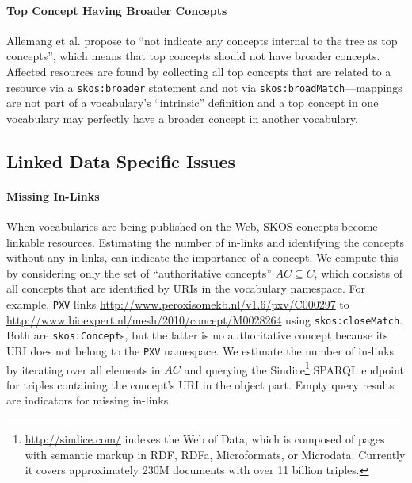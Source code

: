 \paragraph{Top Concept Having Broader Concepts}

Allemang et al. \cite{Allemang2011} propose to ``not indicate any concepts internal to the tree as top concepts'', which means that top concepts should not have broader concepts. 
Affected resources are found by collecting all top concepts that are related to a resource via a \texttt{skos:broader} statement and not via \texttt{skos:broadMatch}---mappings are not part of a vocabulary's ``intrinsic'' definition and a top concept in one vocabulary may perfectly have a broader concept in another vocabulary.


\subsection{Linked Data Specific Issues}\label{subsec:ld_issues}

\paragraph{Missing In-Links}

When vocabularies are being published on the Web, SKOS concepts become linkable resources. Estimating the number of in-links and identifying the concepts without any in-links, can indicate the importance of a concept.
We compute this by considering only the set of ``authoritative concepts'' $AC \subseteq C$, which consists of all concepts that are identified by URIs in the vocabulary namespace. For example, \texttt{PXV} links \url{http://www.peroxisomekb.nl/v1.6/pxv/C000297} to \url{http://www.bioexpert.nl/mesh/2010/concept/M0028264} using \texttt{skos:closeMatch}. Both are \texttt{skos:Concept}s, but the latter is no authoritative concept because its URI does not belong to the \texttt{PXV} namespace. We estimate the number of in-links by iterating over all elements in $AC$ and querying the Sindice\footnote{\url{http://sindice.com/} indexes the Web of Data, which is composed of pages with semantic markup in RDF, RDFa, Microformats, or Microdata. Currently it covers approximately 230M documents with over 11 billion triples.} SPARQL endpoint for triples containing the concept's URI in the object part. Empty query results are indicators for missing in-links.

